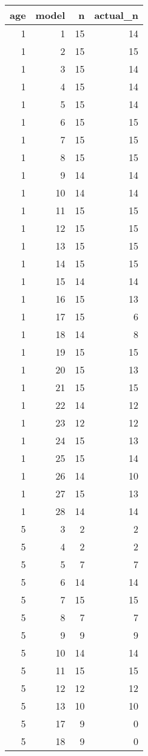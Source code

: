 \documentclass[
]{article}
\begin{document}
\begin{longtable}[]{@{}rrrr@{}}
\toprule()
age & model & n & actual\_n \\
\midrule()
\endhead
1 & 1 & 15 & 14 \\
1 & 2 & 15 & 15 \\
1 & 3 & 15 & 14 \\
1 & 4 & 15 & 14 \\
1 & 5 & 15 & 14 \\
1 & 6 & 15 & 15 \\
1 & 7 & 15 & 15 \\
1 & 8 & 15 & 15 \\
1 & 9 & 14 & 14 \\
1 & 10 & 14 & 14 \\
1 & 11 & 15 & 15 \\
1 & 12 & 15 & 15 \\
1 & 13 & 15 & 15 \\
1 & 14 & 15 & 15 \\
1 & 15 & 14 & 14 \\
1 & 16 & 15 & 13 \\
1 & 17 & 15 & 6 \\
1 & 18 & 14 & 8 \\
1 & 19 & 15 & 15 \\
1 & 20 & 15 & 13 \\
1 & 21 & 15 & 15 \\
1 & 22 & 14 & 12 \\
1 & 23 & 12 & 12 \\
1 & 24 & 15 & 13 \\
1 & 25 & 15 & 14 \\
1 & 26 & 14 & 10 \\
1 & 27 & 15 & 13 \\
1 & 28 & 14 & 14 \\
5 & 3 & 2 & 2 \\
5 & 4 & 2 & 2 \\
5 & 5 & 7 & 7 \\
5 & 6 & 14 & 14 \\
5 & 7 & 15 & 15 \\
5 & 8 & 7 & 7 \\
5 & 9 & 9 & 9 \\
5 & 10 & 14 & 14 \\
5 & 11 & 15 & 15 \\
5 & 12 & 12 & 12 \\
5 & 13 & 10 & 10 \\
5 & 17 & 9 & 0 \\
5 & 18 & 9 & 0 \\

\end{longtable}
\end{document}
